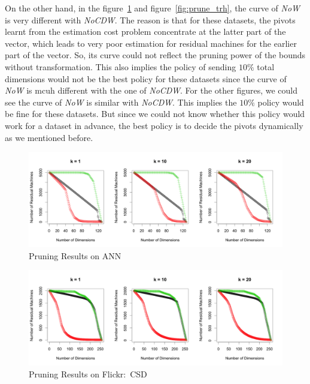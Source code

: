 On the other hand, in the figure~\ref{fig:prune_ANN} and figure~\ref{fig:prune_trh}, the curve of \emph{NoW} is very different with \emph{NoCDW}.  The reason is that for these datasets, the pivots learnt from the estimation cost problem concentrate at the latter part of the vector, which leads to very poor estimation for residual machines for the earlier part of the vector.  So, its curve could not reflect the pruning power of the bounds without transformation.  This also implies the policy of sending $10\%$ total dimensions would not be the best policy for these datasets since the curve of \emph{NoW} is mcuh different with the one of \emph{NoCDW}.  For the other figures, we could see the curve of \emph{NoW} is similar with \emph{NoCDW}. This implies the $10\%$ policy would be fine for these datasets.  But since we could not know whether this policy would work for a dataset in advance, the best policy is to decide the pivots dynamically as we mentioned before.

\begin{figure}[htpb!]
  \centering
  \includegraphics[width=1.0\linewidth]{exp/prune/ANN.png}
  \caption{Pruning Results on ANN}
  \label{fig:prune_ANN}
\end{figure}

\begin{figure}[htpb!]
  \centering
  \includegraphics[width=1.0\linewidth]{exp/prune/f2.png}
  \caption{Pruning Results on Flickr:~CSD}
  \label{fig:prune_f2}
\end{figure}

